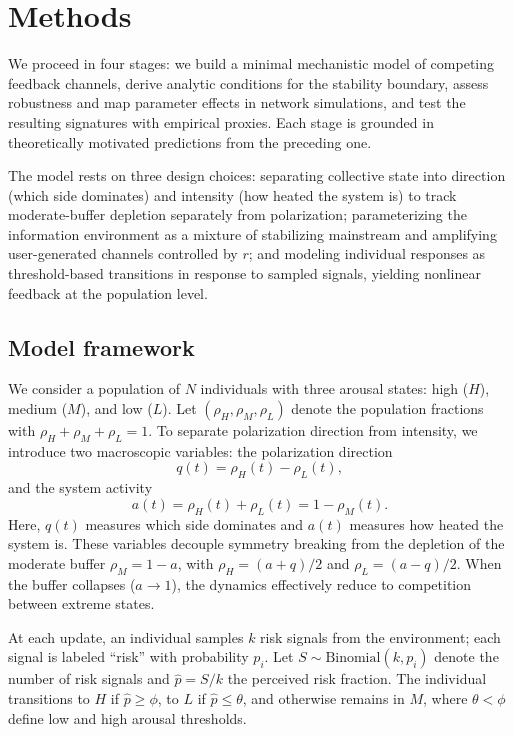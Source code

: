 \documentclass[preprint,12pt]{elsarticle}
\begin{document}
\FloatBarrier

\section{Methods}
\label{sec:methods}
\noindent We proceed in four stages: we build a minimal mechanistic model of competing feedback channels, derive analytic conditions for the stability boundary, assess robustness and map parameter effects in network simulations, and test the resulting signatures with empirical proxies. Each stage is grounded in theoretically motivated predictions from the preceding one.

The model rests on three design choices: separating collective state into direction (which side dominates) and intensity (how heated the system is) to track moderate-buffer depletion separately from polarization; parameterizing the information environment as a mixture of stabilizing mainstream and amplifying user-generated channels controlled by $r$; and modeling individual responses as threshold-based transitions in response to sampled signals, yielding nonlinear feedback at the population level.

\subsection{Model framework}
We consider a population of $N$ individuals with three arousal states: high ($H$), medium ($M$), and low ($L$). Let $(\rho_H,\rho_M,\rho_L)$ denote the population fractions with $\rho_H+\rho_M+\rho_L=1$. To separate polarization direction from intensity, we introduce two macroscopic variables: the polarization direction
\begin{equation}
q(t)=\rho_H(t)-\rho_L(t),
\label{eq:q}
\end{equation}
and the system activity
\begin{equation}
a(t)=\rho_H(t)+\rho_L(t)=1-\rho_M(t).
\label{eq:a}
\end{equation}
Here, $q(t)$ measures which side dominates and $a(t)$ measures how heated the system is. These variables decouple symmetry breaking from the depletion of the moderate buffer $\rho_M=1-a$, with $\rho_H=(a+q)/2$ and $\rho_L=(a-q)/2$. When the buffer collapses ($a\to 1$), the dynamics effectively reduce to competition between extreme states.

At each update, an individual samples $k$ risk signals from the environment; each signal is labeled ``risk'' with probability $p_i$. Let $S\sim\text{Binomial}(k,p_i)$ denote the number of risk signals and $\hat{p}=S/k$ the perceived risk fraction. The individual transitions to $H$ if $\hat{p}\ge\phi$, to $L$ if $\hat{p}\le\theta$, and otherwise remains in $M$, where $\theta<\phi$ define low and high arousal thresholds.
\end{document}
